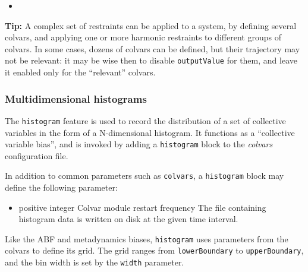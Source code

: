 \begin{itemize}
\item %

\end{itemize}

\textbf{Tip:} A complex set of restraints can be applied to a system,
by defining several colvars, and applying one or more harmonic
restraints to different groups of colvars.  In some cases, dozens of
colvars can be defined, but their trajectory may not be relevant: it
may be wise then to disable \texttt{outputValue} for them, and leave
it enabled only for the ``relevant'' colvars.



\subsubsection{Multidimensional histograms}
\label{sec:colvarbias_histogram}

The \texttt{histogram} feature is used to record the distribution of a set of collective
variables in the form of a N-dimensional histogram.
It functions as a ``collective variable bias'', and is invoked by adding a
\texttt{histogram} block to the \textit{colvars} configuration file.

In addition to common parameters such as \texttt{colvars}, a
\texttt{histogram} block may define the following parameter:

\begin{itemize}
\item {}
  {positive integer}
  {Colvar module restart frequency}
  {The file containing histogram data is written on disk at the given time interval.}
\end{itemize}

Like the ABF and metadynamics biases, \texttt{histogram} uses
parameters from the colvars to define its grid.  The grid ranges from
\texttt{lowerBoundary} to \texttt{upperBoundary}, and the bin width is
set by the \texttt{width} parameter.

